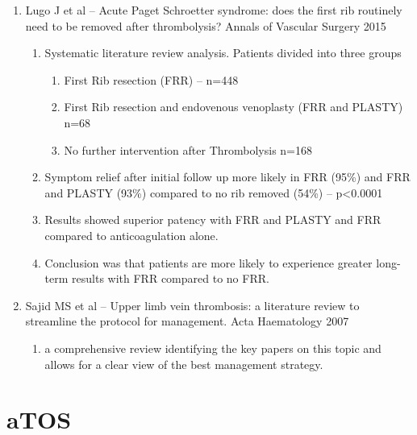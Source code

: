\documentclass[
]{book}
\providecommand{\tightlist}{%
  \setlength{\itemsep}{0pt}\setlength{\parskip}{0pt}}
\begin{document}
\begin{enumerate}
\def\labelenumi{\arabic{enumi}.}
\item
  Lugo J et al -- Acute Paget Schroetter syndrome: does the first rib
  routinely need to be removed after thrombolysis? Annals of Vascular
  Surgery 2015 \citet{lugoAcutePagetSchroetter2015}

  \begin{enumerate}
  \def\labelenumii{\arabic{enumii}.}
  \item
    Systematic literature review analysis. Patients divided into
    three groups

    \begin{enumerate}
    \def\labelenumiii{\arabic{enumiii}.}
    \item
      First Rib resection (FRR) -- n=448
    \item
      First Rib resection and endovenous venoplasty (FRR and
      PLASTY) n=68
    \item
      No further intervention after Thrombolysis n=168
    \end{enumerate}
  \item
    Symptom relief after initial follow up more likely in FRR (95\%)
    and FRR and PLASTY (93\%) compared to no rib removed (54\%) --
    p\textless0.0001
  \item
    Results showed superior patency with FRR and PLASTY and FRR
    compared to anticoagulation alone.~
  \item
    Conclusion was that patients are more likely to experience
    greater long-term results with FRR compared to no FRR.~
  \end{enumerate}
\item
  Sajid MS et al -- Upper limb vein thrombosis: a literature review to
  streamline the protocol for management. Acta Haematology 2007
  \citet{sajidUpperLimbDeep2007}

  \begin{enumerate}
  \def\labelenumii{\arabic{enumii}.}
  \tightlist
  \item
    a comprehensive review identifying the key papers on this topic
    and allows for a clear view of the best management strategy.~
  \end{enumerate}
\end{enumerate}

\hypertarget{atos}{%
\section{aTOS}\label{atos}}
\end{document}
